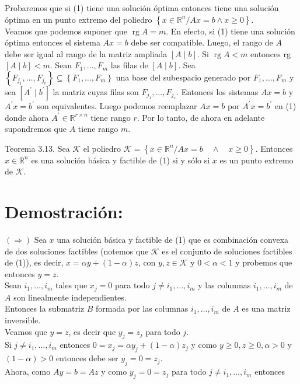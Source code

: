 \documentclass[10pt]{article}
\begin{document}
Probaremos que si (1) tiene una solución óptima entonces tiene una solución óptima en un punto extremo del poliedro $\left\{x \in \mathbb{R}^{n} / A x=b \wedge x \geq 0\right\}$.\\
Veamos que podemos suponer que $\operatorname{rg} A=m$. En efecto, si (1) tiene una solución óptima entonces el sistema $A x=b$ debe ser compatible. Luego, el rango de $A$ debe ser igual al rango de la matriz ampliada $[A \mid b]$. Si $\operatorname{rg} A<m$ entonces rg $[A \mid b]<m$. Sean $F_{1}, \ldots, F_{m}$ las filas de $[A \mid b]$. Sea $\left\{F_{j_{1}}, \ldots, F_{j_{r}}\right\} \subseteq\left\{F_{1}, \ldots, F_{m}\right\}$ una base del subespacio generado por $F_{1}, \ldots, F_{m}$ y sea $\left[A^{\prime} \mid b^{\prime}\right]$ la matriz cuyas filas son $F_{j_{1}}, \ldots, F_{j_{r}}$. Entonces los sistemas $A x=b$ y $A^{\prime} x=b^{\prime}$ son equivalentes. Luego podemos reemplazar $A x=b$ por $A^{\prime} x=b^{\prime}$ en (1) donde ahora $A^{\prime} \in \mathbb{R}^{r \times n}$ tiene rango $r$. Por lo tanto, de ahora en adelante supondremos que $A$ tiene rango $m$.

Teorema 3.13. Sea $\mathcal{K}$ el poliedro $\mathcal{K}=\left\{x \in \mathbb{R}^{n} / A x=b \quad \wedge \quad x \geq 0\right\}$. Entonces $x \in \mathbb{R}^{n}$ es una solución básica y factible de (1) si y sólo si $x$ es un punto extremo de $\mathcal{K}$.

\section*{Demostración:}
$(\Longrightarrow)$ Sea $x$ una solución básica y factible de (1) que es combinación convexa de dos soluciones factibles (notemos que $\mathcal{K}$ es el conjunto de soluciones factibles de (1)), es decir, $x=\alpha y+(1-\alpha) z$, con $y, z \in \mathcal{K}$ y $0<\alpha<1$ y probemos que entonces $y=z$.\\
Sean $i_{1}, \ldots, i_{m}$ tales que $x_{j}=0$ para todo $j \neq i_{1}, \ldots, i_{m}$ y las columnas $i_{1}, \ldots, i_{m}$ de $A$ son linealmente independientes.\\
Entonces la submatriz $B$ formada por las columnas $i_{1}, \ldots, i_{m}$ de $A$ es una matriz inversible.\\
Veamos que $y=z$, es decir que $y_{j}=z_{j}$ para todo $j$.\\
Si $j \neq i_{1}, \ldots, i_{m}$ entonces $0=x_{j}=\alpha y_{j}+(1-\alpha) z_{j}$ y como $y \geq 0, z \geq 0, \alpha>0$ y $(1-\alpha)>0$ entonces debe ser $y_{j}=0=z_{j}$.\\
Ahora, como $A y=b=A z$ y como $y_{j}=0=z_{j}$ para todo $j \neq i_{1}, \ldots, i_{m}$ entonces
\end{document}
